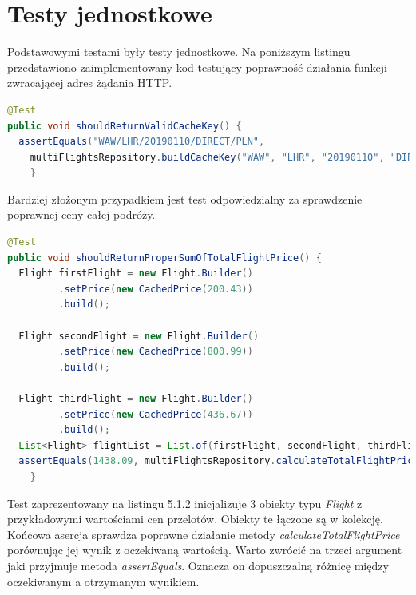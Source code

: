 \documentclass[12pt, twoside]{report}
\begin{document}
\section{Testy jednostkowe}
Podstawowymi testami były testy jednostkowe. Na poniższym listingu przedstawiono zaimplementowany kod testujący poprawność działania funkcji zwracającej adres żądania HTTP.
\begin{lstlisting}[language=java, caption=Przykładowy test jednostkowy]
@Test
public void shouldReturnValidCacheKey() {
  assertEquals("WAW/LHR/20190110/DIRECT/PLN",
    multiFlightsRepository.buildCacheKey("WAW", "LHR", "20190110", "DIRECT", "PLN"));
    }
\end{lstlisting}
Bardziej złożonym przypadkiem jest test odpowiedzialny za sprawdzenie poprawnej ceny całej podróży.
\begin{lstlisting}[language=java, caption=Przykładowy test jednostkowy]
@Test
public void shouldReturnProperSumOfTotalFlightPrice() {
  Flight firstFlight = new Flight.Builder()
         .setPrice(new CachedPrice(200.43))
         .build();
 
  Flight secondFlight = new Flight.Builder()
         .setPrice(new CachedPrice(800.99))
         .build();

  Flight thirdFlight = new Flight.Builder()
         .setPrice(new CachedPrice(436.67))
         .build();
  List<Flight> flightList = List.of(firstFlight, secondFlight, thirdFlight);
  assertEquals(1438.09, multiFlightsRepository.calculateTotalFlightPrice(flightList), 0.001);
    }
\end{lstlisting}
Test zaprezentowany na listingu 5.1.2 inicjalizuje 3 obiekty typu \textit{Flight} z przykładowymi wartościami cen przelotów. Obiekty te łączone są w kolekcję. Końcowa asercja sprawdza poprawne działanie metody \textit{calculateTotalFlightPrice} porównując jej wynik z oczekiwaną wartością. Warto zwrócić na trzeci argument jaki przyjmuje metoda \textit{assertEquals}. Oznacza on dopuszczalną różnicę między oczekiwanym a otrzymanym wynikiem.
\newpage
\end{document}
